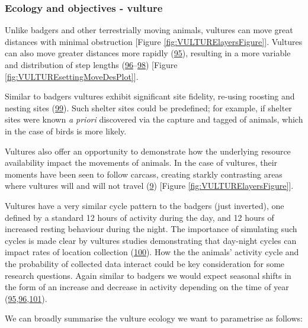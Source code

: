 \documentclass[10pt,a4paper]{article}
\begin{document}
\hypertarget{ecology-and-objectives---vulture}{%
\subsubsection{Ecology and objectives - vulture}\label{ecology-and-objectives---vulture}}

Unlike badgers and other terrestrially moving animals, vultures can move great distances with minimal obstruction {[}Figure \ref{fig:VULTURElayersFigure}{]}.
Vultures can also move greater distances more rapidly (\protect\hyperlink{ref-hribsek_first_2021}{95}), resulting in a more variable and distribution of step lengths (\protect\hyperlink{ref-garcia-jimenez_drivers_2018}{96}--\protect\hyperlink{ref-subedi_spatial_2020}{98}) {[}Figure \ref{fig:VULTUREsettingMoveDesPlot}{]}.

Similar to badgers vultures exhibit significant site fidelity, re-using roosting and nesting sites (\protect\hyperlink{ref-bracis_revisitation_2018}{99}).
Such shelter sites could be predefined; for example, if shelter sites were known \emph{a priori} discovered via the capture and tagged of animals, which in the case of birds is more likely.

Vultures also offer an opportunity to demonstrate how the underlying resource availability impact the movements of animals.
In the case of vultures, their moments have been seen to follow carcass, creating starkly contrasting areas where vultures will and will not travel (\protect\hyperlink{ref-arrondo_invisible_2018}{9}) {[}Figure \ref{fig:VULTURElayersFigure}{]}.

Vultures have a very similar cycle pattern to the badgers (just inverted), one defined by a standard 12 hours of activity during the day, and 12 hours of increased resting behaviour during the night.
The importance of simulating such cycles is made clear by vultures studies demonstrating that day-night cycles can impact rates of location collection (\protect\hyperlink{ref-silva_seasonal_2017}{100}).
How the the animals' activity cycle and the probability of collected data interact could be key consideration for some research questions.
Again similar to badgers we would expect seasonal shifts in the form of an increase and decrease in activity depending on the time of year (\protect\hyperlink{ref-hribsek_first_2021}{95},\protect\hyperlink{ref-garcia-jimenez_drivers_2018}{96},\protect\hyperlink{ref-peshev_new_2021}{101}).

We can broadly summarise the vulture ecology we want to parametrise as follows:
\end{document}
